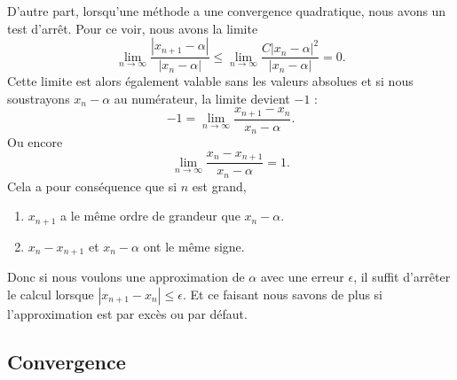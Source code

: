 \begin{normaltext}       \label{NTooVXLXooXlAGEq}
    D'autre part, lorsqu'une méthode a une convergence quadratique, nous avons un test d'arrêt. Pour ce voir, nous avons la limite
    \begin{equation}
        \lim_{n\to \infty} \frac{ | x_{n+1}-\alpha | }{ | x_n-\alpha | }\leq\lim_{n\to \infty} \frac{ C| x_n-\alpha |^2 }{ | x_n-\alpha | }=0.
    \end{equation}
    Cette limite est alors également valable sans les valeurs absolues et si nous soustrayons \( x_n-\alpha\) au numérateur, la limite devient \( -1\) :
    \begin{equation}
        -1=\lim_{n\to \infty} \frac{ x_{n+1}-x_n }{ x_n-\alpha }.
    \end{equation}
    Ou encore
    \begin{equation}
        \lim_{n\to \infty} \frac{ x_n-x_{n+1} }{ x_n-\alpha }=1.
    \end{equation}
    Cela a pour conséquence que si \( n\) est grand,
    \begin{enumerate}
        \item
            \( x_{n+1}\) a le même ordre de grandeur que \( x_n-\alpha\). 
        \item
            \( x_n-x_{n+1}\) et \( x_n-\alpha\) ont le même signe.
    \end{enumerate}
    Donc si nous voulons une approximation de \( \alpha\) avec une erreur \( \epsilon\), il suffit d'arrêter le calcul lorsque \( | x_{n+1}-x_n |\leq \epsilon\). Et ce faisant nous savons de plus si l'approximation est par excès ou par défaut.
\end{normaltext}

\subsection{Convergence}

